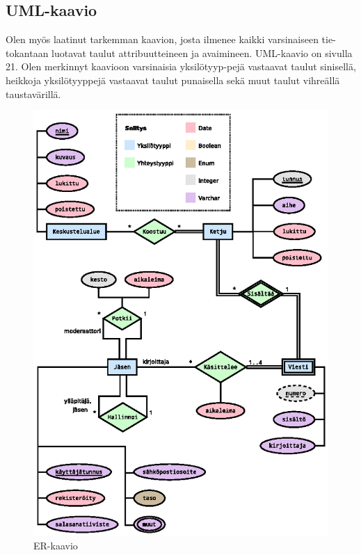 \documentclass[11pt]{article}
\begin{document}
		\subsection{UML-kaavio} Olen myös laatinut tarkemman kaavion, josta ilmenee kaikki varsinaiseen
		tie-tokantaan luotavat taulut attribuutteineen ja avaimineen. UML-kaavio on sivulla 21. Olen merkinnyt
		 kaavioon varsinaisia yksilötyyp-pejä vastaavat taulut sinisellä, heikkoja yksilötyyppejä vastaavat
		 taulut punaisella sekä muut taulut vihreällä taustavärillä.
		
		\newpage
		\thispagestyle{plain}
		\begin{figure}[H]		
			\includegraphics[trim = 6mm 0mm 0mm 20mm, scale = 1.5]{er-kaavio.eps}
			\caption{ER-kaavio}
		\end{figure}
		
\end{document}
